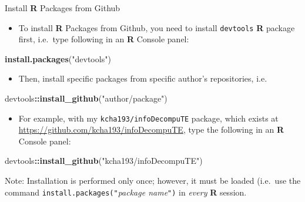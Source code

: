 \documentclass[ignorenonframetext,]{beamer}
\newenvironment{Shaded}{\begin{snugshade}}{\end{snugshade}}
\newcommand{\KeywordTok}[1]{\textcolor[rgb]{0.13,0.29,0.53}{\textbf{#1}}}
\newcommand{\StringTok}[1]{\textcolor[rgb]{0.31,0.60,0.02}{#1}}
\newcommand{\OperatorTok}[1]{\textcolor[rgb]{0.81,0.36,0.00}{\textbf{#1}}}
\newcommand{\NormalTok}[1]{#1}
\providecommand{\tightlist}{%
  \setlength{\itemsep}{0pt}\setlength{\parskip}{0pt}}
\let\oldShaded\Shaded
\let\endoldShaded\endShaded
\renewenvironment{Shaded}{\footnotesize\oldShaded}{\endoldShaded}
\begin{document}
\begin{frame}[fragile]{Install \textbf{R} Packages from Github}

\begin{itemize}
\tightlist
\item
  To install \textbf{R} Packages from Github, you need to install
  \texttt{devtools} \textbf{R} package first, i.e.~type following in an
  \textbf{R} Console panel:
\end{itemize}

\begin{Shaded}
\begin{Highlighting}[]
\KeywordTok{install.packages}\NormalTok{(}\StringTok{"devtools"}\NormalTok{)}
\end{Highlighting}
\end{Shaded}

\begin{itemize}
\tightlist
\item
  Then, install specific packages from specific author's repositories,
  i.e.
\end{itemize}

\begin{Shaded}
\begin{Highlighting}[]
\NormalTok{devtools}\OperatorTok{::}\KeywordTok{install_github}\NormalTok{(}\StringTok{"author/package"}\NormalTok{)}
\end{Highlighting}
\end{Shaded}

\begin{itemize}
\tightlist
\item
  For example, with my \texttt{kcha193/infoDecompuTE} package, which
  exists at \url{https://github.com/kcha193/infoDecompuTE}, type the
  following in an \textbf{R} Console panel:
\end{itemize}

\begin{Shaded}
\begin{Highlighting}[]
\NormalTok{devtools}\OperatorTok{::}\KeywordTok{install_github}\NormalTok{(}\StringTok{"kcha193/infoDecompuTE"}\NormalTok{)}
\end{Highlighting}
\end{Shaded}

Note: Installation is performed only once; however, it must be loaded
(i.e.~use the command \texttt{install.packages("}\emph{package
name}\texttt{")} in \emph{every} \textbf{R} session.

\end{frame}
\end{document}
